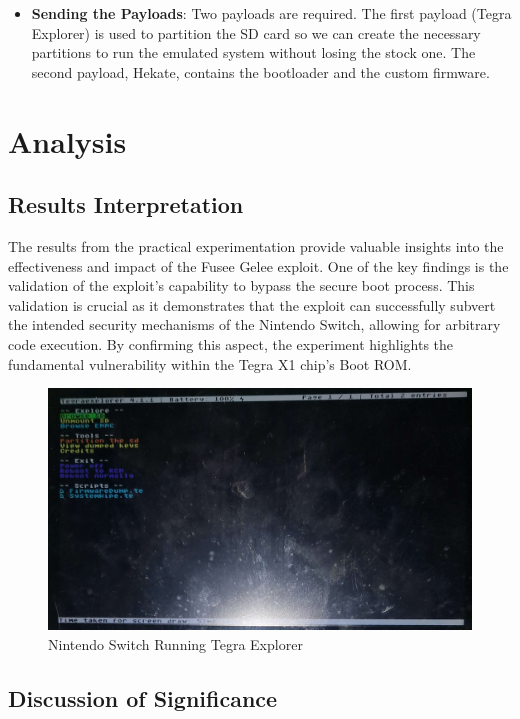 \begin{itemize}
    \item \textbf{Sending the Payloads}: Two payloads are required. The first payload (Tegra Explorer) is used to partition the SD card so we can create the necessary partitions to run the emulated system without losing the stock one. The second payload, Hekate, contains the bootloader and the custom firmware.
\end{itemize}

\section{Analysis}

\subsection{Results Interpretation}

The results from the practical experimentation provide valuable insights into the effectiveness and impact of the Fusee Gelee exploit. One of the key findings is the validation of the exploit's capability to bypass the secure boot process. This validation is crucial as it demonstrates that the exploit can successfully subvert the intended security mechanisms of the Nintendo Switch, allowing for arbitrary code execution. By confirming this aspect, the experiment highlights the fundamental vulnerability within the Tegra X1 chip's Boot ROM.

\begin{figure}[H]
    \centering
    \includegraphics[width=.8\linewidth]{images/tegra_explorer.jpg}
    \caption{Nintendo Switch Running Tegra Explorer}
    \label{fig:switch_boot}
\end{figure}

\subsection{Discussion of Significance}

